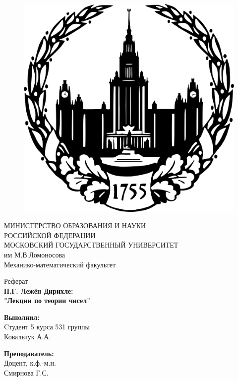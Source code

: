 \begin{titlepage}
\begin{figure}[!htb]
    \centering
    \includegraphics[keepaspectratio=true,scale=1.2]{images/title/msu_logo.png}
\end{figure}

\begin{center}
    МИНИСТЕРСТВО ОБРАЗОВАНИЯ И НАУКИ \\РОССИЙСКОЙ ФЕДЕРАЦИИ
    \vspace{5mm}
    \\ \large{МОСКОВСКИЙ ГОСУДАРСТВЕННЫЙ УНИВЕРСИТЕТ\\ им М.В.Ломоносова}
    \vspace{5mm}
    \\Механико-математический факультет 
\end{center}

\vspace{15mm}
\begin{center}
    \LARGE{Реферат} \\
    {\LARGE{\textbf{П.Г. Лежён Дирихле: \\ "Лекции по теории чисел"}}}
\end{center}
\vspace{30mm}

\begin{minipage}[t]{0.47\textwidth}
	{\large{\textbf{Выполнил:}}{\normalsize\vspace{3mm}
	\\ \large{Cтудент 5 курса 531 группы \\ Ковальчук А.А.} \normalsize\vspace{3mm}}}
\end{minipage}
\hfill
\begin{minipage}[t]{0.47\textwidth}\raggedleft
	{\large{\textbf{Преподаватель:}}{\normalsize\vspace{3mm} 
	\\ \large{Доцент, к.ф.-м.н. \\ Смирнова Г.С. }}}
\end{minipage}


\end{titlepage}
